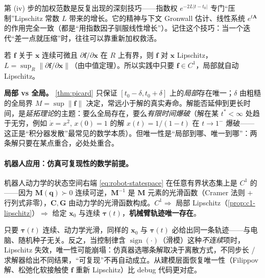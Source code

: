 \begin{insight}
第 (iv) 步的加权范数是反复出现的深刻技巧——指数权 $e^{-2L|t-t_0|}$ 专门“压制”Lipschitz 常数 $L$ 带来的增长。它的精神与下文 Gronwall 估计、线性系统 $e^{t\mathbf{A}}$ 的作用完全一致（都是“用指数因子驯服线性增长”）。记住这个技巧：当一个迭代“差一点就压缩”时，往往可以靠重新加权救活。
\end{insight}

\begin{proposition}\label{prop:c1-lipschitz}
若 $\mathbf{f}$ 关于 $\mathbf{x}$ 连续可微且 $\partial\mathbf{f}/\partial\mathbf{x}$ 在 $R$ 上有界，则 $\mathbf{f}$ 对 $\mathbf{x}$ Lipschitz，$L=\sup_R\|\partial\mathbf{f}/\partial\mathbf{x}\|$（由中值定理）。所以实践中只要 $\mathbf{f}\in C^1$，局部就自动 Lipschitz。
\end{proposition}

\textbf{局部 vs 全局。} \cref{thm:picard} 只保证 $[t_0-\delta,t_0+\delta]$ 上的\emph{局部}存在唯一；$\delta$ 由粗糙的全局界 $M=\sup\|\mathbf{f}\|$ 决定，常远小于解的真实寿命。解能否延伸到更长时间，是\emph{延拓理论}的主题：要么全局存在，要么\emph{有限时间爆破}（解在某 $t^*<\infty$ 处趋于无穷，例如 $\dot x=x^2,\,x(0)=1$ 的解 $x(t)=1/(1-t)$ 在 $t\to1^-$ 爆破——这正是“积分器发散”最常见的数学本质）。但唯一性是“局部到哪、唯一到哪”：两条解只要在某点重合，必处处重合。

\paragraph{机器人应用：仿真可复现性的数学前提。}
机器人动力学的状态空间右端 \cref{eq:robot-statespace} 在任意有界状态集上是 $C^1$ 的——因为 $\mathbf{M}(\mathbf{q})\succ0$ 连续可逆，$\mathbf{M}^{-1}$ 是 $\mathbf{M}$ 元素的光滑函数（Cramer 法则 $+$ 行列式非零），$\mathbf{C},\mathbf{G}$ 由动力学的光滑函数构成。$C^1\Rightarrow$ 局部 Lipschitz（\cref{prop:c1-lipschitz}）$\Rightarrow$ 给定 $\mathbf{x}_0$ 与连续 $\boldsymbol{\tau}(t)$，\textbf{机械臂轨迹唯一存在}。

\begin{insight}
只要 $\boldsymbol{\tau}(t)$ 连续、动力学光滑，同样的 $\mathbf{x}_0$ 与 $\boldsymbol{\tau}(t)$ 必给出同一条轨迹——与电脑、随机种子无关。反之，当控制律含 $\operatorname{sign}(\cdot)$（滑模）这种\emph{不连续}项时，Lipschitz 失效，唯一性可能崩塌：仿真器选哪条解取决于离散方式，不同步长 / 求解器给出不同结果，“可复现”不再自动成立。从建模层面恢复唯一性（Filippov 解、松弛化软接触使 $\mathbf{f}$ 重新 Lipschitz）比 debug 代码更对症。
\end{insight}

